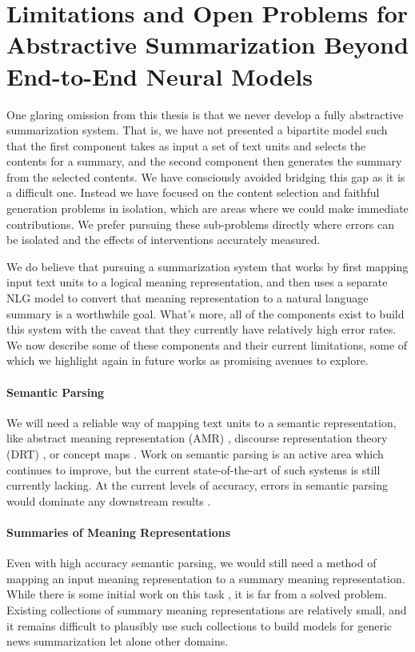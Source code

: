 \section{Limitations and Open Problems for Abstractive Summarization Beyond End-to-End Neural Models}

One glaring omission from this thesis is that we never develop a fully
abstractive summarization system.  That is, we have not presented a bipartite
model such that the first component takes as input a set of text units and
selects the contents for a summary, and the second component then generates the
summary from the selected contents. We have consciously avoided bridging this
gap as it is a difficult one.  Instead we have focused on the content selection
and faithful generation problems in isolation, which are areas where we could
make immediate contributions. We prefer pursuing these sub-problems directly
where errors can be isolated and the effects of interventions accurately
measured.  

We do believe that pursuing a summarization system that works by first mapping
input text units to a logical meaning representation, and then uses a separate
NLG model to convert that meaning representation to a natural language summary
is a worthwhile goal. What's more, all of the components exist to build this
system with the caveat that they currently have relatively high error rates.
We now describe some of these components and their current limitations, some of
which we highlight again in future works as promising avenues to explore.

\paragraph{Semantic Parsing} We will need a reliable way of mapping text units
to a semantic representation, like abstract meaning representation (AMR)
\citep{banarescu2013}, discourse representation theory (DRT)
\citep{basile2012}, or concept maps \citep{yang2020}.  Work on semantic parsing
is an active area which continues to improve, but the current state-of-the-art
of such systems is still currently lacking. At the current levels of accuracy,
errors in semantic parsing would dominate any downstream results
\citep{zhang2019b}. 

\paragraph{Summaries of Meaning Representations} Even with high accuracy
semantic parsing, we would still need a method of mapping an input meaning
representation to a summary meaning representation. While there is some initial
work on this task \citep{falke2017,liao2018,falke2019},  it is far from a
solved problem.  Existing collections of summary meaning representations are
relatively small, and it remains difficult to plausibly use such collections to
build models for generic news summarization let alone other domains.

